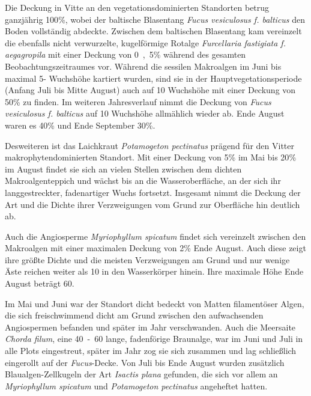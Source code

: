 Die Deckung in Vitte an den vegetationsdominierten Standorten betrug ganzjährig \unit{100}{\%}, wobei der baltische Blasentang \textit{Fucus vesiculosus f. balticus} den Boden vollständig abdeckte. Zwischen dem baltischen Blasentang kam vereinzelt die ebenfalls nicht verwurzelte, kugelförmige Rotalge \textit{Furcellaria fastigiata f. aegagropila} mit einer Deckung von \unit{0,5}{\%} während des gesamten Beobachtungszeitraumes vor. Während die sessilen Makroalgen im Juni bis maximal \unit{5}{\centi\metre}- Wuchshöhe kartiert wurden, sind sie in der Hauptvegetationsperiode (Anfang Juli bis Mitte August) auch auf \unit{10}{\centi\metre} Wuchshöhe mit einer Deckung von \unit{50}{\%} zu finden. Im weiteren Jahresverlauf nimmt die Deckung von \textit{Fucus vesiculosus f. balticus} auf \unit{10}{\centi\metre} Wuchshöhe allmählich wieder ab. Ende August waren es \unit{40}{\%} und Ende September \unit{30}{\%}.

Desweiteren ist das Laichkraut \textit{Potamogeton pectinatus} prägend für den Vitter makrophytendominierten Standort. Mit einer Deckung von \unit{5}{\%} im Mai bis \unit{20}{\%} im August findet sie sich an vielen Stellen zwischen dem dichten Makroalgenteppich und wächst bis an die Wasseroberfläche, an der sich ihr langgestreckter, fadenartiger Wuchs fortsetzt. Insgesamt nimmt die Deckung der Art und die Dichte ihrer Verzweigungen vom Grund zur Oberfläche hin deutlich ab. 

Auch die Angiosperme \textit{Myriophyllum spicatum} findet sich vereinzelt zwischen den Makroalgen mit einer maximalen Deckung von \unit{2}{\%} Ende August. Auch diese zeigt ihre größte Dichte und die meisten Verzweigungen am Grund und nur wenige Äste reichen weiter als \unit{10}{\centi\metre} in den Wasserkörper hinein. Ihre maximale Höhe Ende August beträgt \unit{60}{\centi\metre}.

Im Mai und Juni war der Standort dicht bedeckt von Matten filamentöser Algen, die sich freischwimmend dicht am Grund zwischen den aufwachsenden Angiospermen befanden und später im Jahr verschwanden. Auch die Meersaite \textit{Chorda filum}, eine \unit{40-60}{\centi\metre} lange, fadenförige Braunalge, war im Juni und Juli in alle Plots eingestreut, später im Jahr zog sie sich zusammen und lag schließlich eingerollt auf der \textit{Fucus}-Decke. Von Juli bis Ende August wurden zusätzlich Blaualgen-Zellkugeln der Art \textit{Isactis plana} gefunden, die sich vor allem an \textit{Myriophyllum spicatum} und \textit{Potamogeton pectinatus} angeheftet hatten.



